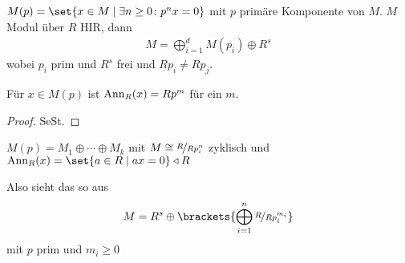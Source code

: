 \begin{erinnerung}
	$M(p) = \set{x \in M \mid \exists n \ge 0\colon p^n x = 0}$ mit $p$ primäre Komponente von $M$. $M$ Modul über $R$ HIR, dann
	\begin{align*}
		M = \bigoplus_{i=1}^d M(p_i)\oplus R^s
	\end{align*}
	wobei $p_i$ prim und $R^s$ frei und $Rp_i \neq R p_j$.
\end{erinnerung}
\begin{lemma}
	Für $x \in M(p)$ ist $\operatorname{Ann}_R(x) = R p^m$ für ein $m$.
\end{lemma}
\begin{proof}
	SeSt.
\end{proof}
\begin{theorem}
	$M(p) = M_1 \oplus \cdots \oplus M_k$ mit $M \cong \lnkset{R}{Rp^n_i}$ zyklisch und $\Ann_R(x) = \set{a \in R \mid ax = 0} \lhd R$
\end{theorem}
\begin{*remark}
	Also sieht das so aus
	\begin{align*}
	M = R^s \oplus \brackets{\bigoplus_{i=1}^n \lnkset{R}{Rp_i^{m_i}}}
	\end{align*}
	mit $p$ prim und $m_i \ge 0$
\end{*remark}
